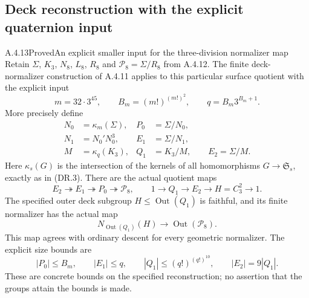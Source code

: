 \subsection{Deck reconstruction with the explicit quaternion input}

\begin{result}{A.4.13}{Proved}{An explicit smaller input for the three-division normalizer map}
Retain $\Sigma$, $K_3$, $N_8$, $L_8$, $R_8$ and
$\mathcal P_8=\Sigma/R_8$ from A.4.12.  The finite
deck-normalizer construction of A.4.11 applies to this
particular surface quotient with the explicit input
\[
 m=32\cdot3^{45},\qquad
 B_m=(m!)^{(m!)^2},\qquad q=B_m3^{B_m+1}.                \tag{QD.1}
\]
More precisely define
\[
\begin{aligned}
 N_0&=\kappa_m(\Sigma),&P_0&=\Sigma/N_0,\\
 N_1&=N_0'N_0^3,&E_1&=\Sigma/N_1,\\
 M&=\kappa_q(K_3),&Q_1&=K_3/M,\qquad E_2=\Sigma/M.
\end{aligned}                                             \tag{QD.2}
\]
Here $\kappa_s(G)$ is the intersection of the kernels of all
homomorphisms $G\to\mathfrak S_s$, exactly as in (DR.3).
There are the actual quotient maps
\[
 E_2\twoheadrightarrow E_1\twoheadrightarrow P_0
      \twoheadrightarrow\mathcal P_8,
 \qquad 1\longrightarrow Q_1\longrightarrow E_2
      \longrightarrow H=C_3^2\longrightarrow1.           \tag{QD.3}
\]
The specified outer deck subgroup $H\leq\operatorname{Out}(Q_1)$
is faithful, and its finite normalizer has the actual map
\[
 N_{\operatorname{Out}(Q_1)}(H)
          \longrightarrow\operatorname{Out}(\mathcal P_8).
                                                        \tag{QD.4}
\]
This map agrees with ordinary descent for every geometric
normalizer.  The explicit size bounds are
\[
 |P_0|\leq B_m,\qquad |E_1|\leq q,\qquad
 |Q_1|\leq(q!)^{(q!)^{10}},\qquad |E_2|=9|Q_1|.
                                                        \tag{QD.5}
\]
These are concrete bounds on the specified reconstruction;
no assertion that the groups attain the bounds is made.
\end{result}

